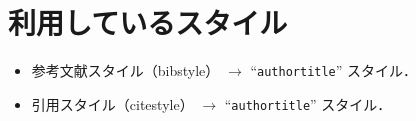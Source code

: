 \documentclass[10pt]{jlreq}
\begin{document}
\section{利用しているスタイル}

\begin{itemize}
 \item 参考文献スタイル（bibstyle） $\rightarrow$ ``\texttt{authortitle}'' スタイル．
 \item 引用スタイル（citestyle） $\rightarrow$ ``\texttt{authortitle}'' スタイル．
\end{itemize}


\end{document}
